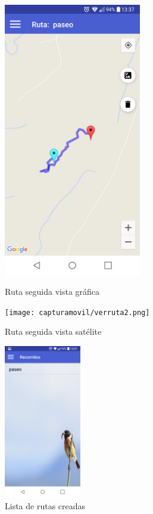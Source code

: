 \begin{figure}[htbp]
\begin{minipage}[b]{0.5\linewidth} %
\centering
\includegraphics[width=6cm]{capturamovil/verruta1.png}
 \label{figura1}
\caption{Ruta seguida vista gráfica}

\end{minipage}
\hspace{0.5cm} %
\begin{minipage}[b]{0.5\linewidth}
\centering
\texttt{[image: capturamovil/verruta2.png]}
 \label{figura2}
\caption{Ruta seguida vista satélite  }

\end{minipage}
\end{figure}


\begin{figure}[H]
		\centering
		\includegraphics[width=0.3\textwidth] {capturamovil/listarutas}
		\caption{Lista de rutas creadas}
	\end{figure}

